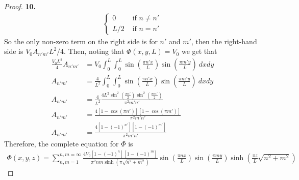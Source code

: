 \documentclass[11pt]{article}
\theoremstyle{definition}
\begin{document}
\begin{proof}{\textbf{10.}}
\begin{align*}
\begin{cases}
        0 &\text{ if } n \neq n'\\
        L/2 &\text{ if }n = n'
    \end{cases}
\end{align*}
So the only non-zero term on the right side is for $n'$ and $m'$, then
the right-hand side is $V_0A_{n'm'}L^2/4$.
Then, noting that $\Phi(x, y, L) = V_0$ we get that
\begin{align*}
    \frac{V_0L^2}{4} A_{n'm'} &= V_0
    \int_0^L\int_0^L\sin(\frac{\pi n' x}{L}) \sin(\frac{\pi m' y}{L})~dxdy\\
    A_{n'm'} &= \frac{4}{L^2}
    \int_0^L\int_0^L\sin(\frac{\pi n' x}{L}) \sin(\frac{\pi m' y}{L})~dxdy\\
    A_{n'm'} &= \frac{4}{L^2}
    \frac{4L^2\sin^2(\frac{\pi n'}{2}) \sin^2(\frac{\pi m'}{2})}{\pi^2 m'n'}\\
    A_{n'm'} &= \frac{4[1 - \cos(\pi n')][1 - \cos(\pi m')]}{\pi^2 m'n'}\\
    A_{n'm'} &= \frac{4[1 - (-1)^{n'}][1 - (-1)^{m'}]}{\pi^2 m'n'}
\end{align*}
Therefore, the complete equation for $\Phi$ is
\begin{align*}
    \Phi(x,y,z) = \sum_{n,m=1}^{n,m=\infty}
    \frac{4V_0[1 - (-1)^{n}][1 - (-1)^{m}]}{\pi^2 nm\sinh(\pi\sqrt{n^2 + m^2})}
    \sin(\frac{\pi n x}{L}) \sin(\frac{\pi m y}{L})
    \sinh(\frac{\pi z}{L}\sqrt{n^2 + m^2})
\end{align*}

\end{proof}
\end{document}
